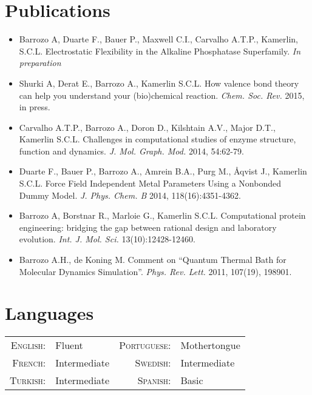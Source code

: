 \documentclass[a4paper,10pt]{article} %
\begin{document}
\section{Publications}

\begin{itemize}
   \item Barrozo A, Duarte F., Bauer P., Maxwell C.I., Carvalho A.T.P., Kamerlin, S.C.L. Electrostatic Flexibility in the Alkaline Phosphatase Superfamily. \textit{In preparation}
   \item Shurki A, Derat E., Barrozo A., Kamerlin S.C.L. How valence bond theory can help you understand your (bio)chemical reaction. \textit{Chem. Soc. Rev.} 2015, in press.
   \item Carvalho A.T.P., Barrozo A., Doron D., Kilshtain A.V., Major D.T., Kamerlin S.C.L. Challenges in computational studies of enzyme structure, function and dynamics. \textit{J. Mol. Graph. Mod.} 2014, 54:62-79.
   \item Duarte F., Bauer P., Barrozo A., Amrein B.A., Purg M., \AA qvist J., Kamerlin S.C.L. Force Field Independent Metal Parameters Using a Nonbonded Dummy Model. \textit{J. Phys. Chem. B} 2014, 118(16):4351-4362.
   \item Barrozo A, Borstnar R., Marloie G., Kamerlin S.C.L. Computational protein engineering: bridging the gap between rational design and laboratory evolution. \textit{Int. J. Mol. Sci.} 13(10):12428-12460.
   \item Barrozo A.H., de Koning M. Comment on “Quantum Thermal Bath for Molecular Dynamics Simulation”. \textit{Phys. Rev. Lett.} 2011, 107(19), 198901. 
\end{itemize}


\section{Languages}

\begin{tabular}{rlrl}
\textsc{English:} & Fluent & \textsc{Portuguese:} & Mothertongue\\

\textsc{French:} & Intermediate & \textsc{Swedish:} & Intermediate\\

\textsc{Turkish:} & Intermediate & \textsc{Spanish:} & Basic\\

\end{tabular}
\end{document}
